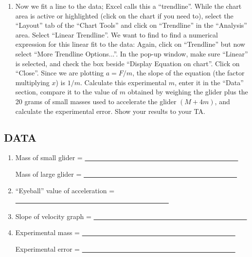 \begin{enumerate}[label=\arabic*.]
\item Now we fit a line to the data; Excel calls this a ``trendline''.  While the chart area is active or highlighted (click on the chart if you need to), select the ``Layout'' tab of the ``Chart Tools'' and click on ``Trendline'' in the ``Analysis'' area.  Select ``Linear Trendline''.  We want to find to find a numerical expression for this linear fit to the data: Again, click on ``Trendline'' but now select ``More Trendline Options...''.  In the pop-up window, make sure ``Linear'' is selected, and check the box beside ``Display Equation on chart''.  Click on ``Close''.  Since we are plotting \(a = F/m\), the slope of the equation (the factor multiplying \(x\)) is \(1/m\).  Calculate this experimental \(m\), enter it in the ``Data'' section, compare it to the value of \(m\) obtained by weighing the glider plus the 20 grams of small masses used to accelerate the glider \((M+4m)\), and calculate the experimental error.  Show your results to your TA.


\end{enumerate}

\subsection*{DATA}

\begin{enumerate}[label=\arabic*.]

\item Mass of small glider = \ul{~~~~~~~~~~~~~~~~~~~~~~~~~~~~~~~~~~~~~~~~~~~~~}

Mass of large glider = \ul{~~~~~~~~~~~~~~~~~~~~~~~~~~~~~~~~~~~~~~~~~~~~~}

\setcounter{enumi}{4}
\item ``Eyeball'' value of acceleration = \ul{~~~~~~~~~~~~~~~~~~~~~~~~~~~~~~~~~~~~~~~~~~~~~}

\item Slope of velocity graph = \ul{~~~~~~~~~~~~~~~~~~~~~~~~~~~~~~~~~~~~~~~~~~~~~}

\setcounter{enumi}{16}
\item Experimental mass = \ul{~~~~~~~~~~~~~~~~~~~~~~~~~~~~~~~~~~~~~~~~~~~~~}

Experimental error = \ul{~~~~~~~~~~~~~~~~~~~~~~~~~~~~~~~~~~~~~~~~~~~~~}

\end{enumerate}

